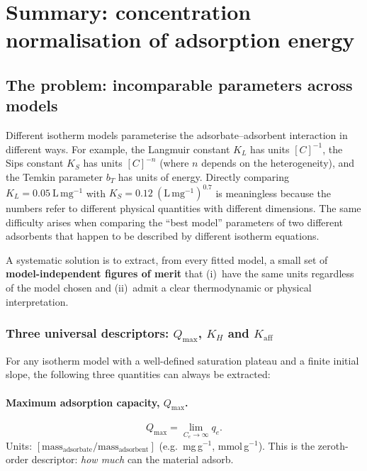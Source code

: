 ﻿	\section{Summary: concentration normalisation of adsorption energy}

	\subsection{The problem: incomparable parameters across models}

	Different isotherm models parameterise the adsorbate--adsorbent
	interaction in different ways.  For example, the Langmuir constant
	$K_L$ has units $[C]^{-1}$, the Sips constant $K_S$ has units
	$[C]^{-n}$ (where $n$ depends on the heterogeneity), and the Temkin
	parameter $b_T$ has units of energy.
	Directly comparing $K_L = 0.05~\mathrm{L\,mg^{-1}}$ with
	$K_S = 0.12~\mathrm{(L\,mg^{-1})^{0.7}}$ is meaningless because
	the numbers refer to different physical quantities with different
	dimensions.  The same difficulty arises when comparing the ``best
	model'' parameters of two different adsorbents that happen to be
	described by different isotherm equations.

	A systematic solution is to extract, from every fitted model, a
	small set of \textbf{model-independent figures of merit} that
	(i)~have the same units regardless of the model chosen and
	(ii)~admit a clear thermodynamic or physical interpretation.

	\subsubsection{Three universal descriptors: $Q_{\max}$, $K_H$ and $K_{\mathrm{aff}}$}

	For any isotherm model with a well-defined saturation plateau and
	a finite initial slope, the following three quantities can always
	be extracted:

	\paragraph{Maximum adsorption capacity, $Q_{\max}$.}
	\begin{equation}
		Q_{\max} = \lim_{C_e \to \infty} q_e.
		\label{eq:Qmax_universal}
	\end{equation}
	Units: $[\text{mass}_{\text{adsorbate}} / \text{mass}_{\text{adsorbent}}]$
	(e.g.\ mg\,g$^{-1}$, mmol\,g$^{-1}$).
	This is the zeroth-order descriptor: \emph{how much} can the
	material adsorb.

